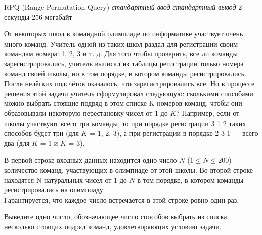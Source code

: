 \begin{problem}%
{RPQ (Range Permutation Query)}%
{\textsl{стандартный ввод}}%
{\textsl{стандартный вывод}}%
{2 секунды}%
{256 мегабайт}{}

От некоторых школ в командной олимпиаде по информатике участвует очень много команд. Учитель одной из таких школ раздал для регистрации своим командам номера: 1, 2, 3 и т. д. Для того чтобы проверить, все ли команды зарегистрировались, учитель выписал из таблицы регистрации только номера команд своей школы, но в том порядке, в котором команды регистрировались.\\

После нелёгких подсчётов оказалось, что зарегистрировались все. Но в процессе решения этой задачи учитель сформулировал следующую: сколькими способами можно выбрать стоящие подряд в этом списке K номеров команд, чтобы они образовывали некоторую перестановку чисел от 1 до $K$? Например, если от школы участвуют всего три команды, то при порядке регистрации 3 1 2 таких способов будет три (для $K$ = 1, 2, 3), а при регистрации в порядке 2 3 1 — всего два (для $K$ = 1 и $K$ = 3).

\InputFile

В первой строке входных данных находится одно число $N$ ($1 \le N \le 200$) — количество команд, участвующих в олимпиаде от этой школы. Во второй строке находятся N натуральных чисел от 1 до $N$ в том порядке, в котором команды регистрировались на олимпиаду.\\

Гарантируется, что каждое число встречается в этой строке ровно один раз.

\OutputFile

Выведите одно число, обозначающее число способов выбрать из списка несколько стоящих подряд команд, удовлетворяющих условию задачи.

\Examples

\begin{example}
%
\end{example}
\end{problem}
